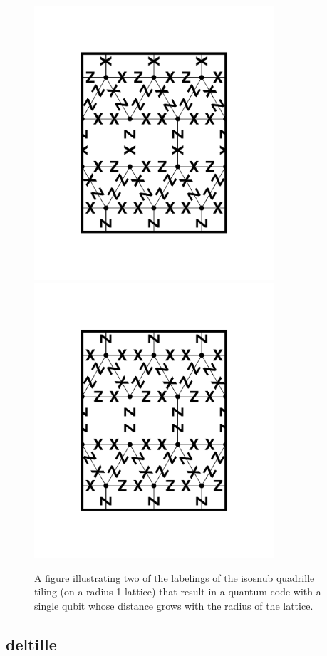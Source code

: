 \documentclass{amsbook}
\theoremstyle{plain}
\theoremstyle{definition}
\theoremstyle{remark}
\begin{document}
\begin{figure}
\includegraphics[width=3.5in]{images/isosnub-quadrille-code-labeling-1} %
\includegraphics[width=3.5in]{images/isosnub-quadrille-code-labeling-2} %
\caption{
\label{figure:isosnub-quadrille-code-r-labeling}
A figure illustrating two of the labelings of the isosnub quadrille tiling (on a radius 1 lattice) that result in a quantum code with a single qubit whose distance grows with the radius of the lattice.
}
\end{figure}
\subsection{deltille}
\end{document}
